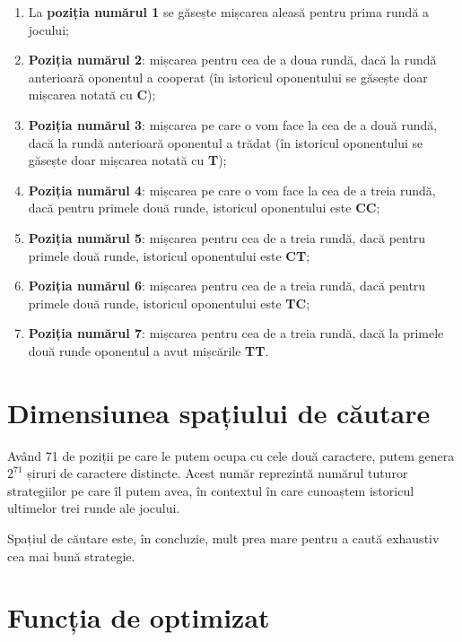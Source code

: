 \begin{enumerate}
	
	\item La \textbf{poziția numărul 1} se găsește mișcarea aleasă pentru prima rundă a jocului;
	
	\item \textbf{Poziția numărul 2}: mișcarea pentru cea de a doua rundă, dacă la rundă anterioară oponentul a cooperat (în istoricul oponentului se găsește doar mișcarea notată cu 
	\textbf{C});
	
	\item \textbf{Poziția numărul 3}: mișcarea pe care o vom face la cea de a două rundă, dacă la rundă anterioară oponentul a trădat (în istoricul oponentului se găsește doar mișcarea notată cu \textbf{T});
	
	\item \textbf{Poziția numărul 4}: mișcarea pe care o vom face la cea de a treia rundă, dacă pentru primele două runde, istoricul oponentului este \textbf{CC};
	
	\item \textbf{Poziția numărul 5}: mișcarea pentru cea de a treia rundă, dacă pentru primele două runde, istoricul oponentului este \textbf{CT};
	
	\item \textbf{Poziția numărul 6}: mișcarea pentru cea de a treia rundă, dacă pentru primele două runde, istoricul oponentului este \textbf{TC};
	
	\item \textbf{Poziția numărul 7}: mișcarea pentru cea de a treia rundă, dacă la primele două runde oponentul a avut mișcările \textbf{TT}.
	
\end{enumerate}

\section{Dimensiunea spațiului de căutare}

Având 71 de poziții pe care le putem ocupa cu cele două caractere, putem genera $2^{71}$ șiruri de caractere distincte. Acest număr reprezintă numărul tuturor strategiilor pe care îl putem avea, în contextul în care cunoaștem istoricul ultimelor trei runde ale jocului.  

Spațiul de căutare este, în concluzie, mult prea mare pentru a caută exhaustiv cea mai bună strategie.

\section{Funcția de optimizat}

